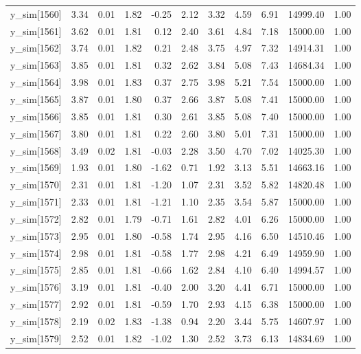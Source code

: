 \begin{table}[ht]
\begin{tabular}{rrrrrrrrrrr}
  y\_sim[1560] & 3.34 & 0.01 & 1.82 & -0.25 & 2.12 & 3.32 & 4.59 & 6.91 & 14999.40 & 1.00 \\ 
  y\_sim[1561] & 3.62 & 0.01 & 1.81 & 0.12 & 2.40 & 3.61 & 4.84 & 7.18 & 15000.00 & 1.00 \\ 
  y\_sim[1562] & 3.74 & 0.01 & 1.82 & 0.21 & 2.48 & 3.75 & 4.97 & 7.32 & 14914.31 & 1.00 \\ 
  y\_sim[1563] & 3.85 & 0.01 & 1.81 & 0.32 & 2.62 & 3.84 & 5.08 & 7.43 & 14684.34 & 1.00 \\ 
  y\_sim[1564] & 3.98 & 0.01 & 1.83 & 0.37 & 2.75 & 3.98 & 5.21 & 7.54 & 15000.00 & 1.00 \\ 
  y\_sim[1565] & 3.87 & 0.01 & 1.80 & 0.37 & 2.66 & 3.87 & 5.08 & 7.41 & 15000.00 & 1.00 \\ 
  y\_sim[1566] & 3.85 & 0.01 & 1.81 & 0.30 & 2.61 & 3.85 & 5.08 & 7.40 & 15000.00 & 1.00 \\ 
  y\_sim[1567] & 3.80 & 0.01 & 1.81 & 0.22 & 2.60 & 3.80 & 5.01 & 7.31 & 15000.00 & 1.00 \\ 
  y\_sim[1568] & 3.49 & 0.02 & 1.81 & -0.03 & 2.28 & 3.50 & 4.70 & 7.02 & 14025.30 & 1.00 \\ 
  y\_sim[1569] & 1.93 & 0.01 & 1.80 & -1.62 & 0.71 & 1.92 & 3.13 & 5.51 & 14663.16 & 1.00 \\ 
  y\_sim[1570] & 2.31 & 0.01 & 1.81 & -1.20 & 1.07 & 2.31 & 3.52 & 5.82 & 14820.48 & 1.00 \\ 
  y\_sim[1571] & 2.33 & 0.01 & 1.81 & -1.21 & 1.10 & 2.35 & 3.54 & 5.87 & 15000.00 & 1.00 \\ 
  y\_sim[1572] & 2.82 & 0.01 & 1.79 & -0.71 & 1.61 & 2.82 & 4.01 & 6.26 & 15000.00 & 1.00 \\ 
  y\_sim[1573] & 2.95 & 0.01 & 1.80 & -0.58 & 1.74 & 2.95 & 4.16 & 6.50 & 14510.46 & 1.00 \\ 
  y\_sim[1574] & 2.98 & 0.01 & 1.81 & -0.58 & 1.77 & 2.98 & 4.21 & 6.49 & 14959.90 & 1.00 \\ 
  y\_sim[1575] & 2.85 & 0.01 & 1.81 & -0.66 & 1.62 & 2.84 & 4.10 & 6.40 & 14994.57 & 1.00 \\ 
  y\_sim[1576] & 3.19 & 0.01 & 1.81 & -0.40 & 2.00 & 3.20 & 4.41 & 6.71 & 15000.00 & 1.00 \\ 
  y\_sim[1577] & 2.92 & 0.01 & 1.81 & -0.59 & 1.70 & 2.93 & 4.15 & 6.38 & 15000.00 & 1.00 \\ 
  y\_sim[1578] & 2.19 & 0.02 & 1.83 & -1.38 & 0.94 & 2.20 & 3.44 & 5.75 & 14607.97 & 1.00 \\ 
  y\_sim[1579] & 2.52 & 0.01 & 1.82 & -1.02 & 1.30 & 2.52 & 3.73 & 6.13 & 14834.69 & 1.00 \\ 

\end{tabular}
\end{table}
